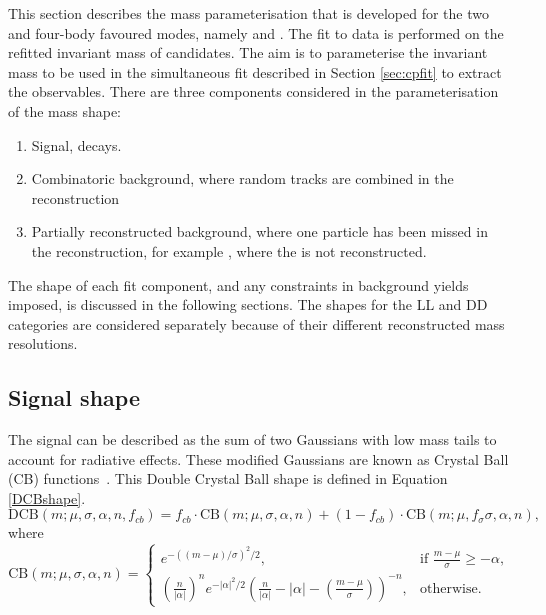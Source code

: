 This section describes the mass parameterisation that is developed for the two and four-body favoured \D modes, namely \decay{\Bm}{\D(\Km\pip)\Kstarm} and \decay{\Bm}{\D(\Km\pip\pim\pip)\Kstarm}. The fit to data is performed on the refitted invariant mass of \B candidates. The aim is to parameterise the invariant \B mass to be used in the simultaneous fit described in Section \ref{sec:cpfit} to extract the \CP observables. There are three components considered in the parameterisation of the mass shape:
\begin{enumerate}
\item Signal, \decay{\Bm}{\D\Kstarm} decays.
\item Combinatoric background, where random tracks are combined in the reconstruction 
\item Partially reconstructed background, where one particle has been missed in the reconstruction, for example \decay{\Bm}{(\decay{\Dstarz}{\Dz[\piz]})\Kstarm}, where the \piz is not reconstructed.
\end{enumerate}

The shape of each fit component, and any constraints in background yields imposed, is discussed in the following sections. The shapes for the LL and DD \KS categories are considered separately because of their different reconstructed \B mass resolutions.

\subsection{Signal shape}
\label{sec:massfit:signal}

The signal can be described as the sum of two Gaussians with low mass tails to account for radiative effects. These modified Gaussians are known as Crystal Ball (CB) functions~\cite{Skwarnicki:1986xj}. This Double Crystal Ball shape is defined in Equation \ref{DCBshape}. 
\begin{equation}
\mathrm{DCB}(m; \mu,\sigma,\alpha,n,f_{cb}) = f_{cb} \cdot \mathrm{CB}(m; \mu,\sigma,\alpha,n) + (1-f_{cb}) \cdot \mathrm{CB}(m;\mu,f_{\sigma}\sigma,\alpha,n),
\label{DCBshape}
\end{equation}
where
\begin{equation*}
  \mathrm{CB}(m; \mu,\sigma,\alpha,n)=
\begin{cases}
    e^{-((m-\mu)/ \sigma)^2/2},                                   & \text{if } \frac{m-\mu}{\sigma} \geq - \alpha, \\
   \left ( \frac{n}{|\alpha|} \right ) ^n e^{-|\alpha|^2/2} \left ( \frac{n}{|\alpha|} - |\alpha| - \left ( \frac{m-\mu}{\sigma} \right ) \right ) ^{-n} ,    & \text{otherwise.}
\end{cases}
\end{equation*}

